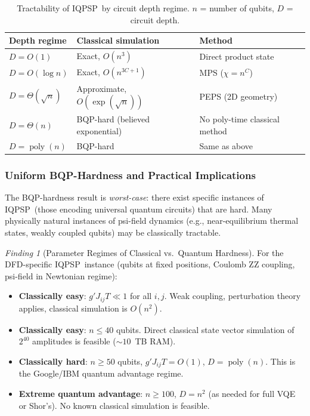 \documentclass[11pt]{article}
\theoremstyle{definition}
\theoremstyle{remark}
\newtheorem{finding}[theorem]{Finding}
\newcommand{\IQPSP}{\textsc{IQPSP}}
\DeclareMathOperator{\poly}{poly}
\begin{document}
\begin{table}[h]
\centering
\caption{Tractability of \IQPSP\ by circuit depth regime.
$n$ = number of qubits, $D$ = circuit depth.}
\label{tab:tractability}
\begin{tabular}{@{}lll@{}}
\toprule
Depth regime & Classical simulation & Method \\
\midrule
$D = O(1)$ & Exact, $O(n^3)$ & Direct product state \\
$D = O(\log n)$ & Exact, $O(n^{3C+1})$ & MPS ($\chi = n^C$) \\
$D = \Theta(\sqrt{n})$ & Approximate, $O(\exp(\sqrt{n}))$ & PEPS (2D geometry) \\
$D = \Theta(n)$ & BQP-hard (believed exponential) & No poly-time classical method \\
$D = \poly(n)$ & BQP-hard & Same as above \\
\bottomrule
\end{tabular}
\end{table}

\subsubsection{Uniform BQP-Hardness and Practical Implications}

The BQP-hardness result is \emph{worst-case}: there exist specific
instances of \IQPSP\ (those encoding universal quantum circuits) that
are hard. Many physically natural instances of psi-field dynamics (e.g.,
near-equilibrium thermal states, weakly coupled qubits) may be
classically tractable.

\begin{finding}[Parameter Regimes of Classical vs.\ Quantum Hardness]
\label{find:regimes}
For the DFD-specific \IQPSP\ instance (qubits at fixed positions,
Coulomb ZZ coupling, psi-field in Newtonian regime):
\begin{itemize}
\item \textbf{Classically easy}: $g' J_{ij} T \ll 1$ for all $i,j$.
  Weak coupling, perturbation theory applies, classical simulation
  is $O(n^2)$.
\item \textbf{Classically easy}: $n \leq 40$ qubits. Direct classical
  state vector simulation of $2^{40}$ amplitudes is feasible ($\sim 10$~TB
  RAM).
\item \textbf{Classically hard}: $n \geq 50$ qubits, $g' J_{ij} T = O(1)$,
  $D = \poly(n)$. This is the Google/IBM quantum advantage regime.
\item \textbf{Extreme quantum advantage}: $n \geq 100$, $D = n^2$
  (as needed for full VQE or Shor's). No known classical simulation
  is feasible.
\end{itemize}
\end{finding}
\end{document}
